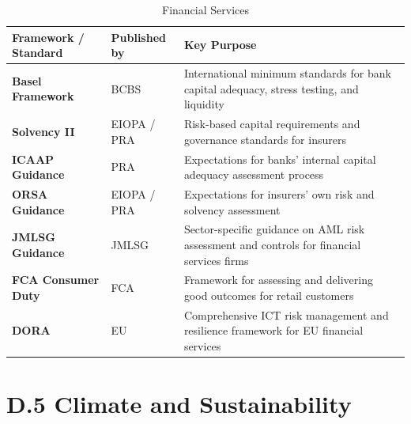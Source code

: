 \begin{table}[H]
  \centering
  \renewcommand{\arraystretch}{1.5}
  \begin{tabularx}{\textwidth}{ | >{\raggedright\arraybackslash}p{} 
								| >{\raggedright\arraybackslash}p{} 
                                | >{\raggedright\arraybackslash}X | }
    \hline
    \textbf{Framework / Standard} & \textbf{Published by} & \textbf{Key Purpose} \\
    \hline
    \textbf{Basel Framework} & BCBS & International minimum standards for bank capital adequacy, stress testing, and liquidity\\
    \hline
    \textbf{Solvency II} & EIOPA / PRA & Risk-based capital requirements and governance standards for insurers\\
    \hline
    \textbf{ICAAP Guidance} & PRA & Expectations for banks' internal capital adequacy assessment process\\
    \hline
    \textbf{ORSA Guidance} & EIOPA / PRA & Expectations for insurers' own risk and solvency assessment\\
    \hline
    \textbf{JMLSG Guidance} & JMLSG & Sector-specific guidance on AML risk assessment and controls for financial services firms\\
    \hline
    \textbf{FCA Consumer Duty} & FCA & Framework for assessing and delivering good outcomes for retail customers\\
    \hline
    \textbf{DORA} & EU & Comprehensive ICT risk management and resilience framework for EU financial services\\
    \hline
  \end{tabularx}
  \caption{Financial Services}
\end{table}

\section*{D.5 Climate and Sustainability}

